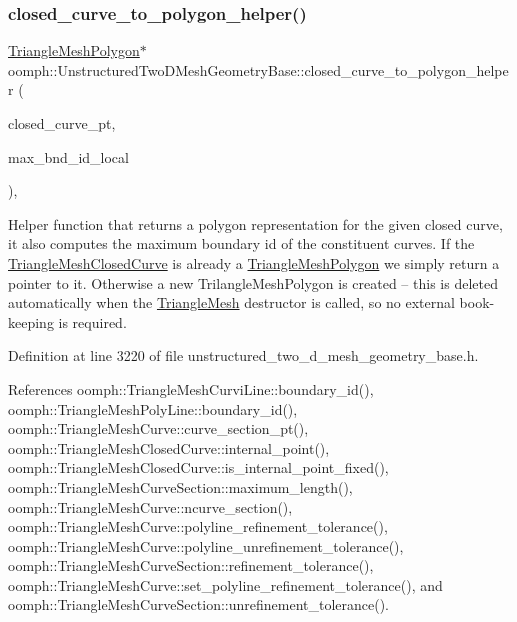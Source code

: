 \subsubsection{\texorpdfstring{closed\+\_\+curve\+\_\+to\+\_\+polygon\+\_\+helper()}{closed\_curve\_to\_polygon\_helper()}}
{\footnotesize\ttfamily \hyperlink{classoomph_1_1TriangleMeshPolygon}{Triangle\+Mesh\+Polygon}$\ast$ oomph\+::\+Unstructured\+Two\+D\+Mesh\+Geometry\+Base\+::closed\+\_\+curve\+\_\+to\+\_\+polygon\+\_\+helper (\begin{DoxyParamCaption}\item[{\hyperlink{classoomph_1_1TriangleMeshClosedCurve}{Triangle\+Mesh\+Closed\+Curve} $\ast$}]{closed\+\_\+curve\+\_\+pt,  }\item[{unsigned \&}]{max\+\_\+bnd\+\_\+id\+\_\+local }\end{DoxyParamCaption})\hspace{0.3cm}{\ttfamily [inline]}, {\ttfamily [protected]}}



Helper function that returns a polygon representation for the given closed curve, it also computes the maximum boundary id of the constituent curves. If the \hyperlink{classoomph_1_1TriangleMeshClosedCurve}{Triangle\+Mesh\+Closed\+Curve} is already a \hyperlink{classoomph_1_1TriangleMeshPolygon}{Triangle\+Mesh\+Polygon} we simply return a pointer to it. Otherwise a new Trilangle\+Mesh\+Polygon is created -- this is deleted automatically when the \hyperlink{classoomph_1_1TriangleMesh}{Triangle\+Mesh} destructor is called, so no external book-\/keeping is required. 



Definition at line 3220 of file unstructured\+\_\+two\+\_\+d\+\_\+mesh\+\_\+geometry\+\_\+base.\+h.



References oomph\+::\+Triangle\+Mesh\+Curvi\+Line\+::boundary\+\_\+id(), oomph\+::\+Triangle\+Mesh\+Poly\+Line\+::boundary\+\_\+id(), oomph\+::\+Triangle\+Mesh\+Curve\+::curve\+\_\+section\+\_\+pt(), oomph\+::\+Triangle\+Mesh\+Closed\+Curve\+::internal\+\_\+point(), oomph\+::\+Triangle\+Mesh\+Closed\+Curve\+::is\+\_\+internal\+\_\+point\+\_\+fixed(), oomph\+::\+Triangle\+Mesh\+Curve\+Section\+::maximum\+\_\+length(), oomph\+::\+Triangle\+Mesh\+Curve\+::ncurve\+\_\+section(), oomph\+::\+Triangle\+Mesh\+Curve\+::polyline\+\_\+refinement\+\_\+tolerance(), oomph\+::\+Triangle\+Mesh\+Curve\+::polyline\+\_\+unrefinement\+\_\+tolerance(), oomph\+::\+Triangle\+Mesh\+Curve\+Section\+::refinement\+\_\+tolerance(), oomph\+::\+Triangle\+Mesh\+Curve\+::set\+\_\+polyline\+\_\+refinement\+\_\+tolerance(), and oomph\+::\+Triangle\+Mesh\+Curve\+Section\+::unrefinement\+\_\+tolerance().

